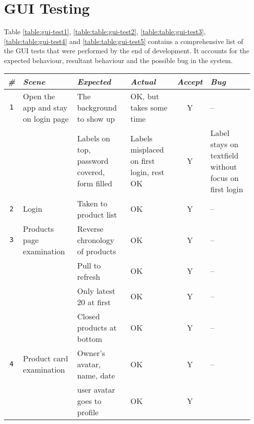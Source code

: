 \chapter{GUI Testing}
\label{appendix:gui-test}

\normalsize
Table \ref{table:gui-test1}, \ref{table:table:gui-test2}, \ref{table:table:gui-test3}, \ref{table:table:gui-test4} and \ref{table:table:gui-test5} contains a comprehensive list of the GUI tests that were performed by the end of development. It accounts for the expected behaviour, resultant behaviour and the possible bug in the system.

\newcolumntype{b}{X}

\small
\begin{sidewaystable}
\centering
    \begin{tabularx}{\textwidth}{cbbbcb}
    \toprule
    \centering
    \emph{\textbf{\#}} & \emph{\textbf{Scene}} & \emph{\textbf{Expected}} & \emph{\textbf{Actual}} & \emph{\textbf{Accept}} & \emph{\textbf{Bug}} \\
    \midrule
    \texttt{1}
    		& Open the app and stay on login page
    		& The background to show up
    		& OK, but takes some time
    		& Y
    		& -- \\
    		\cline{3-6} \noalign{\smallskip}
    		&& Labels on top, password covered, form filled
    		& Labels misplaced on first login, rest OK
    		& Y
    		& Label stays on textfield without focus on first login \\
    \midrule
    \texttt{2}
    		& Login
    		& Taken to product list
    		& OK
    		& Y
    		& -- \\
    \midrule
    \texttt{3}
    		& Products page examination
    		& Reverse chronology of products
    		& OK
    		& Y
    		& -- \\
    		\cline{3-6} \noalign{\smallskip}
    		&& Pull to refresh
    		& OK
    		& Y
    		& --\\
    		\cline{3-6} \noalign{\smallskip}
    		&& Only latest 20 at first
    		& OK
    		& Y
    		& --\\
    		\cline{3-6} \noalign{\smallskip}
    		&& Closed products at bottom
    		& OK
    		& Y
    		& --\\
    \midrule
    \texttt{4}
    		& Product card examination
    		& Owner's avatar, name, date
    		& OK
    		& Y
    		& -- \\
    		\cline{3-6} \noalign{\smallskip}
    		&& user avatar goes to profile
    		& OK
    		& Y

\end{tabularx}
\end{sidewaystable}
